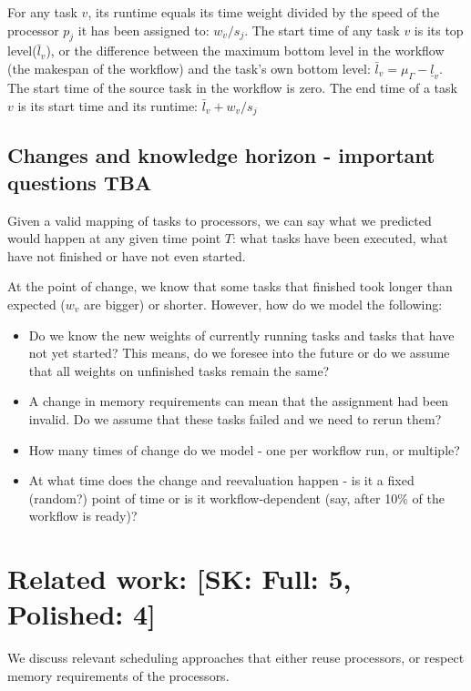 \documentclass[conference]{IEEEtran}
\newcommand{\bottomlevel}[1]{\underline{l}_{#1}} %
\newcommand{\skug}[1]{{\color{blue}[SK: #1]}}
\begin{document}
    For any task $v$, its runtime equals its time weight divided by the speed of the processor $p_j$ it has been assigned to: $w_v/s_j$.
    The start time of any task $v$ is its top level($\bar{l}_v$), or the difference between the maximum bottom level in the workflow (the makespan of the workflow) and the task's own bottom level: $\bar{l}_v = \mu_\Gamma - \bottomlevel{v}$.
    The start time of the source task in the workflow is zero.
    The end time of a task $v$ is its start time and its runtime: $\bar{l}_v + w_v/s_j$

    \subsection{Changes and knowledge horizon - important questions TBA}

    Given a valid mapping of tasks to processors, we can say what we predicted would happen at any given time point $T$: what tasks have been executed, what have not finished or have not even started.

    At the point of change, we know that some tasks that finished took longer than expected ($w_v$ are bigger) or shorter.
    However, how do we model the following:
    \begin{itemize}
        \item Do we know the new weights of currently running tasks and tasks that have not yet started? This means, do we foresee into the future or do we assume that all weights on unfinished tasks remain the same?
        \item A change in memory requirements can mean that the assignment had been invalid. Do we assume that these tasks failed and we need to rerun them?
        \item How many times of change do we model - one per workflow run, or multiple?
        \item At what time does the change and reevaluation happen - is it a fixed (random?) point of time or is it workflow-dependent (say, after 10\% of the workflow is ready)?
    \end{itemize}


    \section{Related work: \skug{Full: 5, Polished: 4}}

    We discuss relevant scheduling approaches that either reuse processors, or respect memory requirements of the processors.
\end{document}
